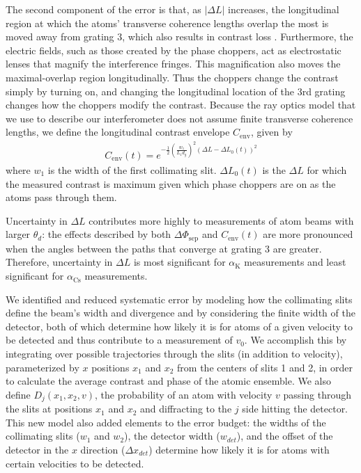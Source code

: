 \documentclass[twocolumn,prl,showpacs,superscriptaddress]{revtex4-1}   %
\newcommand{\ak}{\alpha_{\textrm{K}}}
\newcommand{\acs}{\alpha_{\textrm{Cs}}}
\newcommand{\dphisep}{\Delta\Phi_{\mathrm{sep}}}
\newcommand{\cenv}{C_{\mathrm{env}}}
\begin{document}
The second component of the error is that, as $|\Delta L|$ increases, the longitudinal region at which the atoms' transverse coherence lengths overlap the most is moved away from grating 3, which also results in contrast loss \cite{Champenois1999,McMorran2008}. Furthermore, the electric fields, such as those created by the phase choppers, act as electrostatic lenses that magnify the interference fringes. This magnification also moves the maximal-overlap region longitudinally. Thus the choppers change the contrast simply by turning on, and changing the longitudinal location of the 3rd grating changes how the choppers modify the contrast. Because the ray optics model that we use to describe our interferometer does not assume finite transverse coherence lengths, we define the longitudinal contrast envelope $\cenv$, given by
\begin{align}
	\cenv(t) = e^{-\frac{1}{2} \left( \frac{w_1}{L_1 d_g} \right)^2 (\Delta L - \Delta L_0(t))^2}
	\label{CEnv}
\end{align}
where $w_1$ is the width of the first collimating slit. $\Delta L_0(t)$ is the $\Delta L$ for which the measured contrast is maximum given which phase choppers are on as the atoms pass through them.

Uncertainty in $\Delta L$ contributes more highly to measurements of atom beams with larger $\theta_d$: the effects described by both $\dphisep$ and $\cenv(t)$ are more pronounced when the angles between the paths that converge at grating 3 are greater. Therefore, uncertainty in $\Delta L$ is most significant for $\ak$ measurements and least significant for $\acs$ measurements.

We identified and reduced systematic error by modeling how the collimating slits define the beam's width and divergence and by considering the finite width of the detector, both of which determine how likely it is for atoms of a given velocity to be detected and thus contribute to a measurement of $v_0$. 
We accomplish this by integrating over possible trajectories through the slits (in addition to velocity), parameterized by $x$ positions $x_1$ and $x_2$ from the centers of slits 1 and 2, in order to calculate the average contrast and phase of the atomic ensemble. We also define $D_j(x_1,x_2,v)$, the probability of an atom with velocity $v$ passing through the slits at positions $x_1$ and $x_2$ and diffracting to the $j$ side hitting the detector.
This new model also added elements to the error budget: the widths of the collimating slits ($w_1$ and $w_2$), the detector width ($w_{det}$), and the offset of the detector in the $x$ direction ($\Delta x_{det}$) determine how likely it is for atoms with certain velocities to be detected. 
\end{document}
